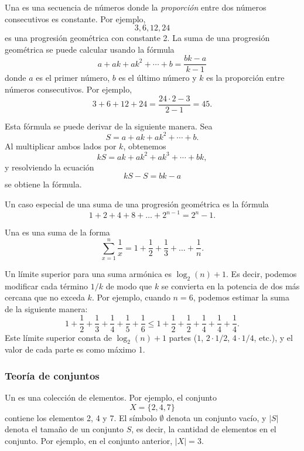 Una  es una secuencia
de números donde la \emph{proporción} entre dos números consecutivos
es constante. Por ejemplo,
\[3,6,12,24\]
es una progresión geométrica con constante 2.
La suma de una progresión geométrica se puede calcular
usando la fórmula
\[a + ak + ak^2 + \cdots + b = \frac{bk-a}{k-1}\]
donde $a$ es el primer número,
$b$ es el último número y $k$ es la
proporción entre números consecutivos.
Por ejemplo,
\[3+6+12+24=\frac{24 \cdot 2 - 3}{2-1} = 45.\]

Esta fórmula se puede derivar de la siguiente manera. Sea
\[ S = a + ak + ak^2 + \cdots + b .\]
Al multiplicar ambos lados por $k$, obtenemos
\[ kS = ak + ak^2 + ak^3 + \cdots + bk,\]
y resolviendo la ecuación
\[ kS-S = bk-a\]
se obtiene la fórmula.

Un caso especial de una suma de una progresión geométrica es la fórmula
\[1+2+4+8+\ldots+2^{n-1}=2^n-1.\]


Una  es una suma de la forma
\[ \sum_{x=1}^n \frac{1}{x} = 1+\frac{1}{2}+\frac{1}{3}+\ldots+\frac{1}{n}.\]

Un límite superior para una suma armónica es $\log_2(n)+1$.
Es decir, podemos
modificar cada término $1/k$ de modo que $k$ se convierta
en la potencia de dos más cercana que no exceda $k$.
Por ejemplo, cuando $n=6$, podemos estimar
la suma de la siguiente manera:
\[ 1+\frac{1}{2}+\frac{1}{3}+\frac{1}{4}+\frac{1}{5}+\frac{1}{6} \le
    1+\frac{1}{2}+\frac{1}{2}+\frac{1}{4}+\frac{1}{4}+\frac{1}{4}.\]
Este límite superior consta de $\log_2(n)+1$ partes
($1$, $2 \cdot 1/2$, $4 \cdot 1/4$, etc.),
y el valor de cada parte es como máximo 1.

\subsubsection{Teoría de conjuntos}


Un  es una colección de elementos.
Por ejemplo, el conjunto
\[X=\{2,4,7\}\]
contiene los elementos 2, 4 y 7.
El símbolo $\emptyset$ denota un conjunto vacío,
y $|S|$ denota el tamaño de un conjunto $S$,
es decir, la cantidad de elementos en el conjunto.
Por ejemplo, en el conjunto anterior, $|X|=3$.

